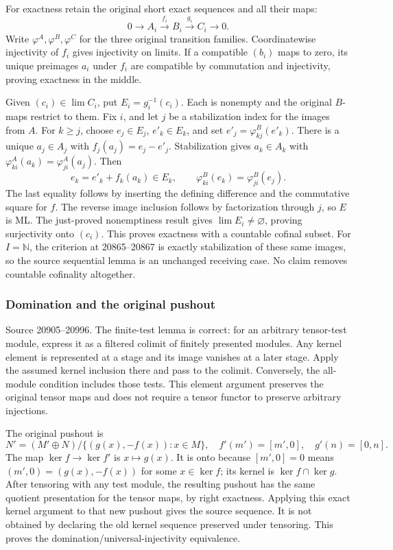 For exactness retain the original short exact sequences and all their maps: \[
0\longrightarrow A_i\xrightarrow{f_i}B_i\xrightarrow{g_i}C_i\longrightarrow0.
\] Write \(\varphi^A,\varphi^B,\varphi^C\) for the three original transition families. Coordinatewise injectivity of \(f_i\) gives injectivity on limits. If a compatible \((b_i)\) maps to zero, its unique preimages \(a_i\) under \(f_i\) are compatible by commutation and injectivity, proving exactness in the middle.

Given \((c_i)\in\lim C_i\), put \(E_i=g_i^{-1}(c_i)\). Each is nonempty and the original \(B\)-maps restrict to them. Fix \(i\), and let \(j\) be a stabilization index for the images from \(A\). For \(k\geq j\), choose \(e_j\in E_j\), \(e'_k\in E_k\), and set \(e'_j=\varphi^B_{kj}(e'_k)\). There is a unique \(a_j\in A_j\) with \(f_j(a_j)=e_j-e'_j\). Stabilization gives \(a_k\in A_k\) with \(\varphi^A_{ki}(a_k)=\varphi^A_{ji}(a_j)\). Then \[
e_k=e'_k+f_k(a_k)\in E_k,
\qquad
\varphi^B_{ki}(e_k)=\varphi^B_{ji}(e_j).
\] The last equality follows by inserting the defining difference and the commutative square for \(f\). The reverse image inclusion follows by factorization through \(j\), so \(E\) is ML. The just-proved nonemptiness result gives \(\lim E_i\ne\varnothing\), proving surjectivity onto \((c_i)\). This proves exactness with a countable cofinal subset. For \(I=\mathbb N\), the criterion at 20865--20867 is exactly stabilization of these same images, so the source sequential lemma is an unchanged receiving case. No claim removes countable cofinality altogether.

\subsubsection{Domination and the original pushout}\label{algebra-proof-012-domination-and-the-original-pushout}

Source 20905--20996. The finite-test lemma is correct: for an arbitrary tensor-test module, express it as a filtered colimit of finitely presented modules. Any kernel element is represented at a stage and its image vanishes at a later stage. Apply the assumed kernel inclusion there and pass to the colimit. Conversely, the all-module condition includes those tests. This element argument preserves the original tensor maps and does not require a tensor functor to preserve arbitrary injections.

The original pushout is \[
N'=(M'\oplus N)/\{(g(x),-f(x)):x\in M\},
\quad f'(m')=[m',0],\quad g'(n)=[0,n].
\] The map \(\ker f\to\ker f'\) is \(x\mapsto g(x)\). It is onto because \([m',0]=0\) means \((m',0)=(g(x),-f(x))\) for some \(x\in\ker f\); its kernel is \(\ker f\cap\ker g\). After tensoring with any test module, the resulting pushout has the same quotient presentation for the tensor maps, by right exactness. Applying this exact kernel argument to that new pushout gives the source sequence. It is not obtained by declaring the old kernel sequence preserved under tensoring. This proves the domination/universal-injectivity equivalence.

